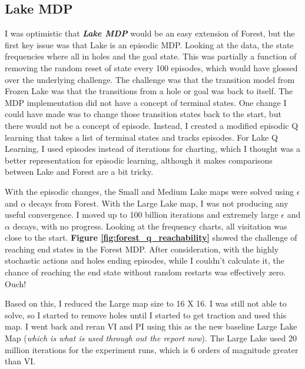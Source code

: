 \documentclass[letterpaper]{article} %
\begin{document}
\subsection{Lake MDP} 
I was optimistic that \textbf{\emph{Lake MDP}} would be an easy extension of Forest, but the first key issue was that Lake is an episodic MDP.  Looking at the data, the state frequencies where all in holes and the goal state.  This was partially a function of removing the random reset of state every 100 episodes, which would have glossed over the underlying challenge.  The challenge was that the transition model from Frozen Lake was that the transitions from a hole or goal was back to itself.  The MDP implementation did not have a concept of terminal states.  One change I could have made was to change those transition states back to the start, but there would not be a concept of episode.  Instead, I created a modified episodic Q learning that takes a list of terminal states and tracks episodes.  For Lake Q Learning, I used episodes instead of iterations for charting, which I thought was a better representation for episodic learning, although it makes comparisons between Lake and Forest are a bit tricky.

With the episodic changes, the Small and Medium Lake maps were solved using  $\epsilon$ and $\alpha$ decays from Forest.  With the Large Lake map, I was not producing any useful convergence.  I moved up to 100 billion iterations and extremely large $\epsilon$ and $\alpha$ decays, with no progress.  Looking at the frequency charts, all visitation was close to the start.   \textbf{Figure \ref{fig:forest_q_reachability}} showed the challenge of reaching end states in the Forest MDP.  After consideration, with the highly stochastic actions and holes ending episodes, while I couldn't calculate it, the chance of reaching the end state without random restarts was effectively zero.  Ouch!

Based on this, I reduced the Large map size to 16 X 16.  I was still not able to solve, so I started to remove holes until I started to get traction and used this map. I went back and reran VI and PI using this as the new baseline Large Lake Map  (\emph{which is what is used through out the report now}).  The Large Lake used 20 million iterations for the experiment runs, which is 6 orders of magnitude greater than VI.
\end{document}
